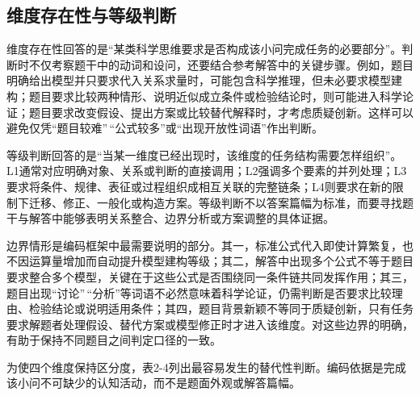 \documentclass[
  12pt,
  a4paper,twoside,openany]{ctexbook}
\begin{document}
\subsection{维度存在性与等级判断}\label{ux7ef4ux5ea6ux5b58ux5728ux6027ux4e0eux7b49ux7ea7ux5224ux65ad}

维度存在性回答的是``某类科学思维要求是否构成该小问完成任务的必要部分''。判断时不仅考察题干中的动词和设问，还要结合参考解答中的关键步骤。例如，题目明确给出模型并只要求代入关系求量时，可能包含科学推理，但未必要求模型建构；题目要求比较两种情形、说明近似成立条件或检验结论时，则可能进入科学论证；题目要求改变假设、提出方案或比较替代解释时，才考虑质疑创新。这样可以避免仅凭``题目较难''\,``公式较多''或``出现开放性词语''作出判断。

等级判断回答的是``当某一维度已经出现时，该维度的任务结构需要怎样组织''。L1通常对应明确对象、关系或判断的直接调用；L2强调多个要素的并列处理；L3要求将条件、规律、表征或过程组织成相互关联的完整链条；L4则要求在新的限制下迁移、修正、一般化或构造方案。等级判断不以答案篇幅为标准，而要寻找题干与解答中能够表明关系整合、边界分析或方案调整的具体证据。

边界情形是编码框架中最需要说明的部分。其一，标准公式代入即使计算繁复，也不因运算量增加而自动提升模型建构等级；其二，解答中出现多个公式不等于题目要求整合多个模型，关键在于这些公式是否围绕同一条件链共同发挥作用；其三，题目出现``讨论''\,``分析''等词语不必然意味着科学论证，仍需判断是否要求比较理由、检验结论或说明适用条件；其四，题目背景新颖不等同于质疑创新，只有任务要求解题者处理假设、替代方案或模型修正时才进入该维度。对这些边界的明确，有助于保持不同题目之间判定口径的一致。

为使四个维度保持区分度，表2-4列出最容易发生的替代性判断。编码依据是完成该小问不可缺少的认知活动，而不是题面外观或解答篇幅。
\end{document}

